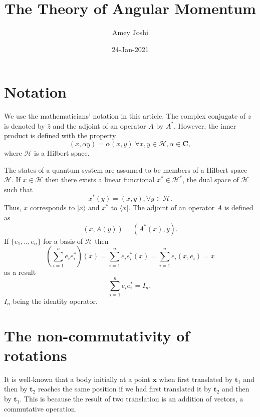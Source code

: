 \documentclass{article}
\title{The Theory of Angular Momentum}
\author{Amey Joshi}
\date{24-Jan-2021}
\numberwithin{equation}{section}
\let\vec\bm
\theoremstyle{plain}
\numberwithin{thm}{section}
\theoremstyle{plain}
\numberwithin{prop}{section}
\theoremstyle{definition}
\numberwithin{defn}{section}
\theoremstyle{remark}
\begin{document}
\maketitle
{}
\section{Notation}\label{s1}
We use the mathematicians' notation in this article. The complex conjugate of
$z$ is denoted by $\bar{z}$ and the adjoint of an operator $A$ by $A^\ast$.
However, the inner product is defined with the property
\begin{equation}\label{s1e1}
(x,\alpha y)=\alpha(x, y)\;\forall x, y \in \mathcal{H}, \alpha \in \mathbf{C},
\end{equation}
where $\mathcal{H}$ is a Hilbert space.

The states of a quantum system are assumed to be members of a Hilbert space
$\mathcal{H}$. If $x \in \mathcal{H}$ then there exists a linear functional
$x^\ast \in \mathcal{H}^\ast$, the dual space of $\mathcal{H}$ such that
\begin{equation}\label{s1e2}
x^\ast(y) = (x, y), \forall y \in \mathcal{H}.
\end{equation}
Thus, $x$ corresponds to $|x\rangle$ and $x^\ast$ to $\langle x|$. The adjoint
of an operator $A$ is defined as
\begin{equation}\label{s1e3}
(x, A(y)) = (A^\ast(x), y).
\end{equation}
If $\{e_1, \ldots\, e_n\}$ for a basis of $\mathcal{H}$ then
\begin{equation}\label{s1e4}
\left(\sum_{i=1}^n e_i e_i^\ast\right)(x) = \sum_{i=1}^n e_i e_i^\ast(x) = 
\sum_{i=1}^n e_i (x, e_i) = x
\end{equation}
as a result
\begin{equation}\label{s1e5}
\sum_{i=1}^n e_i e_i^\ast = I_n,
\end{equation}
$I_n$ being the identity operator.

\section{The non-commutativity of rotations}\label{s2}
It is well-known that a body initially at a point $\vec{x}$ when first 
translated by $\vec{t}_1$ and then by $\vec{t}_2$ reaches the same position if 
we had first translated it by $\vec{t}_2$ and then by $\vec{t}_1$. This is 
because the result of two translation is an addition of vectors, a commutative 
operation.
\end{document}
